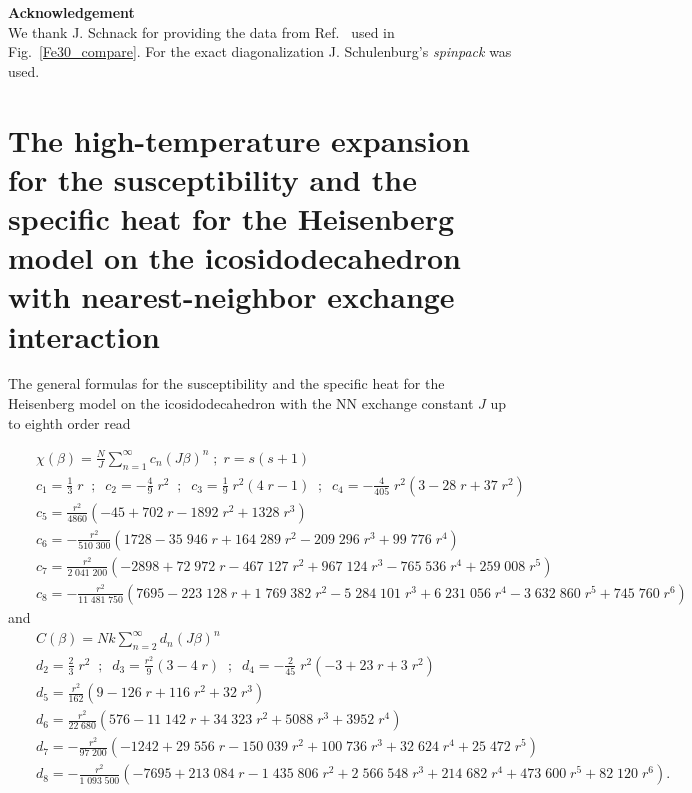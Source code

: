 \documentclass[aps,twocolumn,groupedaddress]{revtex4}
\begin{document}
\vspace{1cm}

{\bf Acknowledgement}\\
We thank J. Schnack for providing the data from Ref.~ used in
Fig.~\ref{Fe30_compare}.
For the exact diagonalization J. Schulenburg's {\it  spinpack} was used.




\appendix

\section{The high-temperature
expansion for the susceptibility and the specific heat for the Heisenberg
model on the icosidodecahedron with nearest-neighbor exchange interaction
}
\label{app_icosi}
The general formulas for the  susceptibility and the specific heat for the
Heisenberg
model on the icosidodecahedron with the NN exchange constant $J$
up to eighth order read
\begin{widetext}
\begin{eqnarray} \label{HTE_chi_fe30}
&& \chi(\beta)=\frac{N}{J}\sum_{n=1}^\infty c_n(J\beta)^n \; ; \; r=s(s+1)\\
&&c_1=\frac{1}{3}\; r \;\; ; \;\; c_2=-\frac{4}{9}\; r^2 \;\; ; \;\;
c_3=\frac{1}{9}\; r^2(4\; r-1)\;\; ; \;\;
c_4=-\frac{4}{405}\; r^2(3-28\; r+37\; r^2)\nonumber\\
&&c_5=\frac{r^2}{4860}(-45+702\; r-1892\; r^2+1328\; r^3)\nonumber\\
&&c_6=-\frac{r^2}{510\;300}(1728-35\;946\; r+164\;289\; r^2-209\;296\; r^3+99\;776\; r^4)\nonumber\\
&&c_7=\frac{r^2}{2\;041\;200}(-2898+72\;972\; r-467\;127\; r^2+967\;124\; r^3-765\;536\; r^4+259\;008\; r^5)\nonumber\\
&&c_8=-\frac{r^2}{11\;481\;750}(7695-223\;128\; r+1\;769\;382\; r^2-5\;284\;101\;
r^3+6\;231\;056\; r^4 -3\;632\;860\; r^5+745\;760\; r^6)\nonumber
\end{eqnarray}
and
\begin{eqnarray} \label{HTE_C_fe30}
&& C(\beta)=Nk\sum_{n=2}^\infty d_n (J\beta)^n \\
&& d_2=\frac{2}{3}\; r^2 \;\; ; \;\;
d_3=\frac{r^2}{9}(3-4\; r) \;\; ; \;\;
d_4=-\frac{2}{45}\; r^2(-3+23\; r+3\; r^2)\nonumber\\
&&d_5=\frac{r^2}{162}(9-126\; r+116\; r^2+32\; r^3)\nonumber\\
&&d_6=\frac{r^2}{22\;680}(576-11\;142\; r+34\;323\; r^2+5088\; r^3+3952\;
r^4)\nonumber\\
&&d_7=-\frac{r^2}{97\;200}(-1242+29\;556\; r-150\;039\; r^2+100\;736\;
r^3+32\;624\; r^4+25\;472\; r^5)\nonumber\\
&& d_8=-\frac{r^2}{1\;093\;500}(-7695+213\;084\; r-1\;435\;806\; r^2+2\;566\;548\;
r^3+214\;682\; r^4 +473\;600\; r^5+82\;120\; r^6).\nonumber
\end{eqnarray}
\end{widetext}
\end{document}

